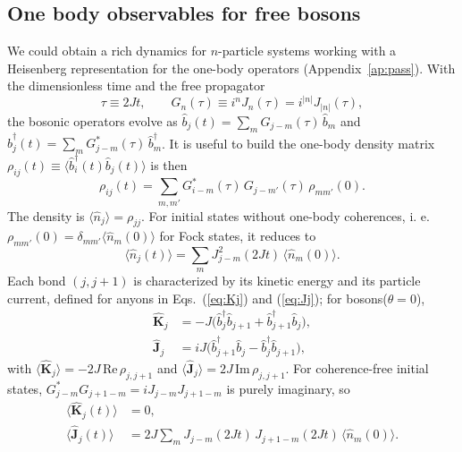 \documentclass[a4paper, amsfonts, amssymb, amsmath, reprint, showkeys, nofootinbib ,twoside]{revtex4-2}
\begin{document}
\subsection{One body observables for free bosons} 
We could obtain a rich dynamics for $n$-particle systems working with a Heisenberg representation for the one-body operators (Appendix~\ref{ap:pass}). With the dimensionless time and the free propagator
\begin{equation}\label{eq:Gn}
\tau\equiv 2Jt,\qquad G_n(\tau)\equiv i^{n}J_n(\tau)=i^{|n|}J_{|n|}(\tau),
\end{equation}
the bosonic operators evolve as $\hat b_j(t)=\sum_m G_{j-m}(\tau)\,\hat b_m$ and $\hat b^\dagger_j(t)=\sum_m G^*_{j-m}(\tau)\,\hat b^\dagger_m$. It is useful to build the one-body density matrix $\rho_{ij}(t)\equiv\langle\hat b_i^\dagger(t)\hat b_j(t)\rangle$ is then
\begin{equation}\label{eq:rhofree}
\rho_{ij}(t)=\sum_{m,m'}G^*_{i-m}(\tau)\,G_{j-m'}(\tau)\,\rho_{mm'}(0).
\end{equation}
The density is $\langle\hat n_j\rangle=\rho_{jj}$. For initial states without one-body coherences, i. e. $\rho_{mm'}(0)=\delta_{mm'}\langle\hat n_m(0)\rangle$ for Fock states, it reduces to
\begin{equation}\label{eq:nfree}
\langle \hat{n}_j(t) \rangle = \sum_{m} J^2_{j-m}(2Jt)\, \langle \hat{n}_m(0) \rangle .
\end{equation}
Each bond $(j,j+1)$ is characterized by its kinetic energy and its particle current, defined for anyons in Eqs.~(\ref{eq:Kj}) and (\ref{eq:Jj}); for bosons($\theta=0$),
\begin{align}
\hat{\mathbf K}_j&=-J\big(\hat b_j^\dagger\hat b_{j+1}+\hat b_{j+1}^\dagger\hat b_j\big),\\
\hat{\mathbf J}_j&=iJ\big(\hat b_{j+1}^\dagger\hat b_j-\hat b_j^\dagger\hat b_{j+1}\big),
\end{align}
with $\langle\hat{\mathbf K}_j\rangle=-2J\,\mathrm{Re}\,\rho_{j,j+1}$ and $\langle\hat{\mathbf J}_j\rangle=2J\,\mathrm{Im}\,\rho_{j,j+1}$. For coherence-free initial states, $G^*_{j-m}G_{j+1-m}=iJ_{j-m}J_{j+1-m}$ is purely imaginary, so
\begin{align}
\langle\hat{\mathbf K}_j(t)\rangle&=0,\label{eq:Kfree}\\
\langle\hat{\mathbf J}_j(t)\rangle&=2J\sum_m J_{j-m}(2Jt)\,J_{j+1-m}(2Jt)\,\langle\hat n_m(0)\rangle.\label{eq:Jfree}
\end{align}
%
\end{document}
